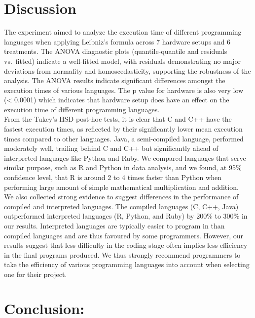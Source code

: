 \documentclass[12pt,halfline,a4paper,]{ouparticle}
\begin{document}
\section{Discussion}\label{discussion}

The experiment aimed to analyze the execution time of different
programming languages when applying Leibniz's formula across 7 hardware
setups and 6 treatments. The ANOVA diagnostic plots (quantile-quantile
and residuals vs.~fitted) indicate a well-fitted model, with residuals
demonstrating no major deviations from normality and homoscedasticity,
supporting the robustness of the analysis. The ANOVA results indicate
significant differences amongst the execution times of various
languages. The p value for hardware is also very low (\textless{}
0.0001) which indicates that hardware setup does have an effect on the
execution time of different programming languages.\\
From the Tukey's HSD post-hoc tests, it is clear that C and C++ have the
fastest execution times, as reflected by their significantly lower mean
execution times compared to other languages. Java, a semi-compiled
language, performed moderately well, trailing behind C and C++ but
significantly ahead of interpreted languages like Python and Ruby. We
compared languages that serve similar purpose, such as R and Python in
data analysis, and we found, at 95\% confidence level, that R is around
2 to 4 times faster than Python when performing large amount of simple
mathematical multiplication and addition.\\
We also collected strong evidence to suggest differences in the
performance of compiled and interpreted languages. The compiled
languages (C, C++, Java) outperformed interpreted languages (R, Python,
and Ruby) by 200\% to 300\% in our results. Interpreted languages are
typically easier to program in than compiled languages and are thus
favoured by some programmers. However, our results suggest that less
difficulty in the coding stage often implies less efficiency in the
final programs produced. We thus strongly recommend programmers to take
the efficiency of various programming languages into account when
selecting one for their project.

\section{Conclusion:}\label{conclusion}
\end{document}
